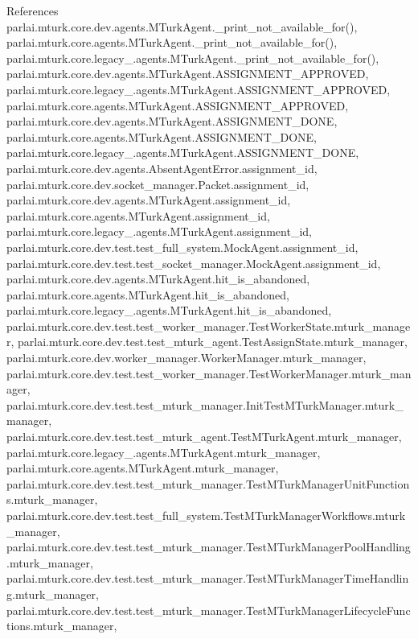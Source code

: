 References parlai.\+mturk.\+core.\+dev.\+agents.\+M\+Turk\+Agent.\+\_\+print\+\_\+not\+\_\+available\+\_\+for(), parlai.\+mturk.\+core.\+agents.\+M\+Turk\+Agent.\+\_\+print\+\_\+not\+\_\+available\+\_\+for(), parlai.\+mturk.\+core.\+legacy\+\_.\+agents.\+M\+Turk\+Agent.\+\_\+print\+\_\+not\+\_\+available\+\_\+for(), parlai.\+mturk.\+core.\+dev.\+agents.\+M\+Turk\+Agent.\+A\+S\+S\+I\+G\+N\+M\+E\+N\+T\+\_\+\+A\+P\+P\+R\+O\+V\+ED, parlai.\+mturk.\+core.\+legacy\+\_.\+agents.\+M\+Turk\+Agent.\+A\+S\+S\+I\+G\+N\+M\+E\+N\+T\+\_\+\+A\+P\+P\+R\+O\+V\+ED, parlai.\+mturk.\+core.\+agents.\+M\+Turk\+Agent.\+A\+S\+S\+I\+G\+N\+M\+E\+N\+T\+\_\+\+A\+P\+P\+R\+O\+V\+ED, parlai.\+mturk.\+core.\+dev.\+agents.\+M\+Turk\+Agent.\+A\+S\+S\+I\+G\+N\+M\+E\+N\+T\+\_\+\+D\+O\+NE, parlai.\+mturk.\+core.\+agents.\+M\+Turk\+Agent.\+A\+S\+S\+I\+G\+N\+M\+E\+N\+T\+\_\+\+D\+O\+NE, parlai.\+mturk.\+core.\+legacy\+\_.\+agents.\+M\+Turk\+Agent.\+A\+S\+S\+I\+G\+N\+M\+E\+N\+T\+\_\+\+D\+O\+NE, parlai.\+mturk.\+core.\+dev.\+agents.\+Absent\+Agent\+Error.\+assignment\+\_\+id, parlai.\+mturk.\+core.\+dev.\+socket\+\_\+manager.\+Packet.\+assignment\+\_\+id, parlai.\+mturk.\+core.\+dev.\+agents.\+M\+Turk\+Agent.\+assignment\+\_\+id, parlai.\+mturk.\+core.\+agents.\+M\+Turk\+Agent.\+assignment\+\_\+id, parlai.\+mturk.\+core.\+legacy\+\_.\+agents.\+M\+Turk\+Agent.\+assignment\+\_\+id, parlai.\+mturk.\+core.\+dev.\+test.\+test\+\_\+full\+\_\+system.\+Mock\+Agent.\+assignment\+\_\+id, parlai.\+mturk.\+core.\+dev.\+test.\+test\+\_\+socket\+\_\+manager.\+Mock\+Agent.\+assignment\+\_\+id, parlai.\+mturk.\+core.\+dev.\+agents.\+M\+Turk\+Agent.\+hit\+\_\+is\+\_\+abandoned, parlai.\+mturk.\+core.\+agents.\+M\+Turk\+Agent.\+hit\+\_\+is\+\_\+abandoned, parlai.\+mturk.\+core.\+legacy\+\_.\+agents.\+M\+Turk\+Agent.\+hit\+\_\+is\+\_\+abandoned, parlai.\+mturk.\+core.\+dev.\+test.\+test\+\_\+worker\+\_\+manager.\+Test\+Worker\+State.\+mturk\+\_\+manager, parlai.\+mturk.\+core.\+dev.\+test.\+test\+\_\+mturk\+\_\+agent.\+Test\+Assign\+State.\+mturk\+\_\+manager, parlai.\+mturk.\+core.\+dev.\+worker\+\_\+manager.\+Worker\+Manager.\+mturk\+\_\+manager, parlai.\+mturk.\+core.\+dev.\+test.\+test\+\_\+worker\+\_\+manager.\+Test\+Worker\+Manager.\+mturk\+\_\+manager, parlai.\+mturk.\+core.\+dev.\+test.\+test\+\_\+mturk\+\_\+manager.\+Init\+Test\+M\+Turk\+Manager.\+mturk\+\_\+manager, parlai.\+mturk.\+core.\+dev.\+test.\+test\+\_\+mturk\+\_\+agent.\+Test\+M\+Turk\+Agent.\+mturk\+\_\+manager, parlai.\+mturk.\+core.\+legacy\+\_.\+agents.\+M\+Turk\+Agent.\+mturk\+\_\+manager, parlai.\+mturk.\+core.\+agents.\+M\+Turk\+Agent.\+mturk\+\_\+manager, parlai.\+mturk.\+core.\+dev.\+test.\+test\+\_\+mturk\+\_\+manager.\+Test\+M\+Turk\+Manager\+Unit\+Functions.\+mturk\+\_\+manager, parlai.\+mturk.\+core.\+dev.\+test.\+test\+\_\+full\+\_\+system.\+Test\+M\+Turk\+Manager\+Workflows.\+mturk\+\_\+manager, parlai.\+mturk.\+core.\+dev.\+test.\+test\+\_\+mturk\+\_\+manager.\+Test\+M\+Turk\+Manager\+Pool\+Handling.\+mturk\+\_\+manager, parlai.\+mturk.\+core.\+dev.\+test.\+test\+\_\+mturk\+\_\+manager.\+Test\+M\+Turk\+Manager\+Time\+Handling.\+mturk\+\_\+manager, parlai.\+mturk.\+core.\+dev.\+test.\+test\+\_\+mturk\+\_\+manager.\+Test\+M\+Turk\+Manager\+Lifecycle\+Functions.\+mturk\+\_\+manager, 